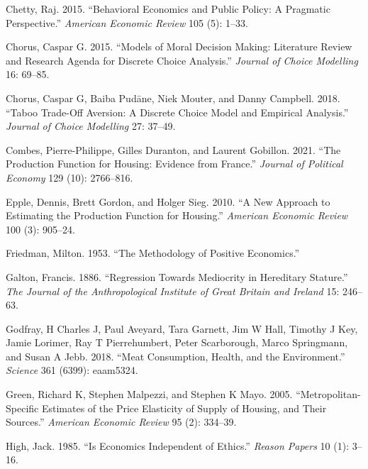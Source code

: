 \documentclass[
]{book}
\newlength{\cslhangindent}
\newlength{\cslentryspacingunit} %
\newenvironment{CSLReferences}[2] %
 {%
  \setlength{\parindent}{0pt}
  \ifodd #1
  \let\oldpar\par
  \def\par{\hangindent=\cslhangindent\oldpar}
  \fi
  \setlength{\parskip}{#2\cslentryspacingunit}
 }%
 {}
\begin{document}
\begin{CSLReferences}{1}{0}
\leavevmode{}%
Chetty, Raj. 2015. {``Behavioral Economics and Public Policy: A Pragmatic Perspective.''} \emph{American Economic Review} 105 (5): 1--33.

\leavevmode{}%
Chorus, Caspar G. 2015. {``Models of Moral Decision Making: Literature Review and Research Agenda for Discrete Choice Analysis.''} \emph{Journal of Choice Modelling} 16: 69--85.

\leavevmode{}%
Chorus, Caspar G, Baiba Pudāne, Niek Mouter, and Danny Campbell. 2018. {``Taboo Trade-Off Aversion: A Discrete Choice Model and Empirical Analysis.''} \emph{Journal of Choice Modelling} 27: 37--49.

\leavevmode{}%
Combes, Pierre-Philippe, Gilles Duranton, and Laurent Gobillon. 2021. {``The Production Function for Housing: Evidence from France.''} \emph{Journal of Political Economy} 129 (10): 2766--816.

\leavevmode{}%
Epple, Dennis, Brett Gordon, and Holger Sieg. 2010. {``A New Approach to Estimating the Production Function for Housing.''} \emph{American Economic Review} 100 (3): 905--24.

\leavevmode{}%
Friedman, Milton. 1953. {``The Methodology of Positive Economics.''}

\leavevmode{}%
Galton, Francis. 1886. {``Regression Towards Mediocrity in Hereditary Stature.''} \emph{The Journal of the Anthropological Institute of Great Britain and Ireland} 15: 246--63.

\leavevmode{}%
Godfray, H Charles J, Paul Aveyard, Tara Garnett, Jim W Hall, Timothy J Key, Jamie Lorimer, Ray T Pierrehumbert, Peter Scarborough, Marco Springmann, and Susan A Jebb. 2018. {``Meat Consumption, Health, and the Environment.''} \emph{Science} 361 (6399): eaam5324.

\leavevmode{}%
Green, Richard K, Stephen Malpezzi, and Stephen K Mayo. 2005. {``Metropolitan-Specific Estimates of the Price Elasticity of Supply of Housing, and Their Sources.''} \emph{American Economic Review} 95 (2): 334--39.

\leavevmode{}%
High, Jack. 1985. {``Is Economics Independent of Ethics.''} \emph{Reason Papers} 10 (1): 3--16.


\end{CSLReferences}
\end{document}
